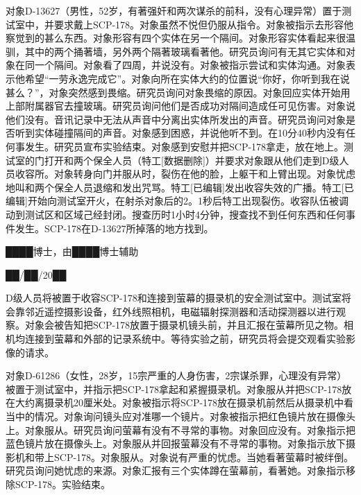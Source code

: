 对象D-13627（男性，52岁，有著强奸和两次谋杀的前科，没有心理异常）置于测试室中，并要求戴上SCP-178。对象虽然不悦但仍服从指令。对象被指示去形容他察觉到的甚么东西。对象形容有四个实体在另一个隔间。对象形容实体看起来很温驯，其中的两个捅著墙，另外两个隔著玻璃看著他。研究员询问有无其它实体和对象在同一个隔间。对象看了四周，并说没有。对象被指示尝试和实体沟通。对象表示他希望“一劳永逸完成它”。对象向所在实体大约的位置说“你好，你听到我在说甚么？”，对象突然感到畏缩。研究员询问对象畏缩的原因。对象回应实体开始用上部附属器官去撞玻璃。研究员询问他们是否成功对隔间造成任可见伤害。对象说他们没有。音讯记录中无法从声音中分离出实体所发出的声音。研究员询问对象是否听到实体碰撞隔间的声音。对象感到困惑，并说他听不到。在10分40秒内没有任何事发生。研究员宣布实验结束。对象感到安慰并把SCP-178拿走，放在地上。测试室的门打开和两个保全人员（特工{[}数据删除]）并要求对象跟从他们走到D级人员收容所。对象转身向门并服从时，裂伤在他的脸，上躯干和上臂出现。对象忧虑地叫和两个保全人员退缩和发出咒骂。特工{[}已编辑]发出收容失效的广播。特工{[}已编辑]开始向测试室开火，在射杀对象后的2。1秒后特工出现裂伤。收容队伍被调动到测试区和区域己经封闭。搜查历时1小时4分钟，搜查找不到任何东西和任何事件发生。SCP-178在D-13627所掉落的地方找到。


\hr


████博士，由████博士辅助

██\slash ██\slash 20██

D级人员将被置于收容SCP-178和连接到萤幕的摄录机的安全测试室中。测试室将会靠邻近遥控摄影设备，红外线照相机，电磁辐射探测器和活动探测器以进行观察。对象会被告知把SCP-178放置于摄录机镜头前，并且汇报在萤幕所见之物。相机均连接到萤幕和外部的记录系统中。等待实验之前，研究员将会提交观看实验影像的请求。

对象D-61286（女性，28岁，15宗严重的人身伤害，2宗谋杀罪，心理没有异常）被置于测试室中，并指示把SCP-178拿起和紧握摄录机。对象服从并把SCP-178放在大约离摄录机20厘米处。对象被指示将SCP-178放在摄录机前然后从摄录机中看当中的情况。对象询问镜头应对准哪一个镜片。对象被指示把红色镜片放在摄像头上。对象服从。研究员询问萤幕有没有不寻常的事物。对象回应没有。对象指示把蓝色镜片放在摄像头上。对象服从并回报萤幕没有不寻常的事物。对象指示放下摄影机和带上SCP-178。对象服从。对象说有严重的忧虑。当她看著萤幕时被绊倒。研究员询问她忧虑的来源。对象汇报有三个实体蹲在萤幕前，看著她。对象指示移除SCP-178。实验结束。

